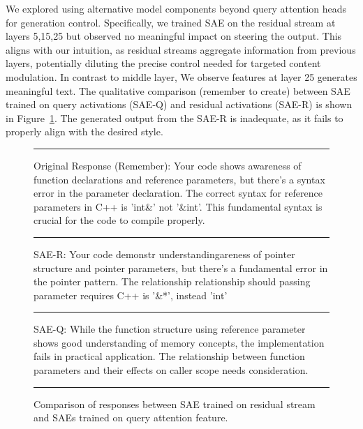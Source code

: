 We explored using alternative model components beyond query attention heads for generation control. Specifically, we trained SAE on the residual stream at layers 5,15,25 but observed no meaningful impact on steering the output. This aligns with our intuition, as residual streams aggregate information from previous layers, potentially diluting the precise control needed for targeted content modulation. In contrast to middle layer, We observe features at layer 25 generates meaningful text. The qualitative comparison (remember to create) between SAE trained on query activations (SAE-Q) and residual activations (SAE-R) is shown in Figure~\ref{fig:responses}. The generated output from the SAE-R is inadequate, as it fails to properly align with the desired style.
\begin{figure}[!htbp]
{\small
\hrule
\vspace{.1cm}
Original Response (Remember): Your code shows awareness of function declarations and reference parameters, but there's a syntax error in the parameter declaration. The correct syntax for reference parameters in C++ is 'int\&' not '\&int'. This fundamental syntax is crucial for the code to compile properly.
\vspace{.1cm}
\hrule
\vspace{.1cm}
SAE-R: Your code demonstr understandingareness of pointer structure and pointer parameters, but there's a fundamental error in the pointer pattern. The relationship relationship should passing parameter requires C++ is '\&*', instead 'int'
\vspace{.1cm}
\hrule
\vspace{.1cm}
SAE-Q: While the function structure using reference parameter shows good understanding of memory concepts, the implementation fails in practical application. The relationship between function parameters and their effects on caller scope needs consideration.
\vspace{.1cm}
\hrule
\vspace{.1cm}
}
\caption{Comparison of responses between SAE trained on residual stream and SAEs trained on query attention feature.}
\label{fig:responses}
\end{figure}




